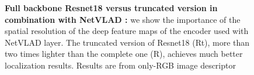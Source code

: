 \begin{figure}
	\caption{\label{fig:trunc_resnet} \textbf{Full backbone Resnet18 versus truncated version in combination with NetVLAD :} we show the importance of the spatial resolution of the deep feature maps of the encoder used with NetVLAD layer. The truncated version of Resnet18 (Rt), more than two times lighter than the complete one (R), achieves much better localization results. Results are from only-RGB image descriptor~\citep{Arandjelovic2017}}
	
\end{figure}